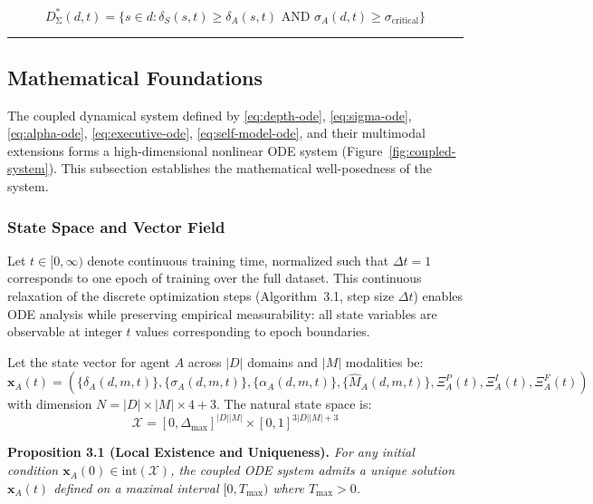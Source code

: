 \begin{equation}\label{eq:shortcut-threshold}
D^*_{\text{Σ}}(d,t) = \{s \in d : \delta_S(s,t) \geq \delta_A(s,t) \text{ AND } \sigma_A(d,t) \geq \sigma_{\text{critical}}\}
\end{equation}

\noindent\rule{\linewidth}{0.4pt}

\subsection{Mathematical Foundations}\label{sec:math-foundations}

The coupled dynamical system defined by \eqref{eq:depth-ode},
\eqref{eq:sigma-ode}, \eqref{eq:alpha-ode}, \eqref{eq:executive-ode},
\eqref{eq:self-model-ode}, and their multimodal extensions forms a
high-dimensional nonlinear ODE system (Figure~\ref{fig:coupled-system}). This subsection establishes the
mathematical well-posedness of the system.

\subsubsection{State Space and Vector Field}\label{sec:state-space}

Let $t \in [0, \infty)$ denote continuous training time, normalized such that
$\Delta t = 1$ corresponds to one epoch of training over the full dataset.
This continuous relaxation of the discrete optimization steps (Algorithm~3.1,
step size $\Delta t$) enables ODE analysis while preserving empirical
measurability: all state variables are observable at integer $t$ values
corresponding to epoch boundaries.

Let the state vector for agent $A$ across $|D|$ domains and $|M|$
modalities be:
\begin{equation}\label{eq:state-vector}
\mathbf{x}_A(t) = \left(\{\delta_A(d,m,t)\}, \{\sigma_A(d,m,t)\}, \{\alpha_A(d,m,t)\}, \{\hat{M}_A(d,m,t)\}, \Xi_A^P(t), \Xi_A^I(t), \Xi_A^F(t)\right)
\end{equation}
with dimension $N = |D|\times|M|\times 4 + 3$. The natural state space is:
\begin{equation}\label{eq:state-space}
\mathcal{X} = [0, \Delta_{\max}]^{ |D||M| } \times [0,1]^{3|D||M| + 3}
\end{equation}

\textbf{Proposition 3.1 (Local Existence and Uniqueness).} %
\textit{For any initial condition $\mathbf{x}_A(0) \in \text{int}(\mathcal{X})$,
the coupled ODE system admits a unique solution $\mathbf{x}_A(t)$ defined
on a maximal interval $[0, T_{\max})$ where $T_{\max} > 0$.}

